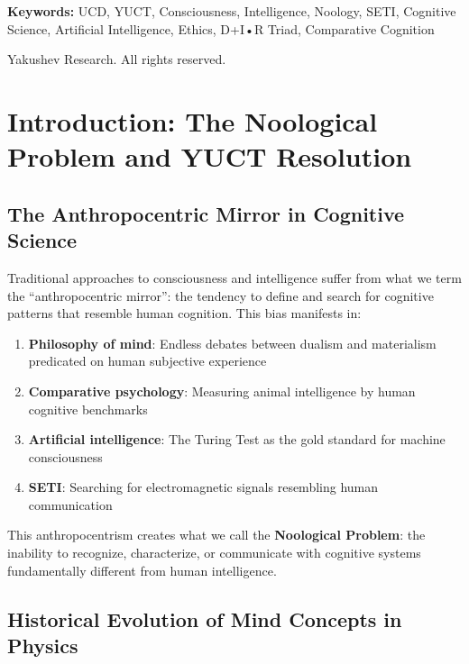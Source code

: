 \documentclass[12pt,a4paper]{article}
\begin{document}
\begin{titlepage}
\begin{center}
			\vspace{0cm}
			
			\noindent
			\small\textbf{Keywords:} UCD, YUCT, Consciousness, Intelligence, Noology, SETI, Cognitive Science, Artificial Intelligence, Ethics, D+I•R Triad, Comparative Cognition
			
			\vspace{0.5cm}
			
			\noindent
			 Yakushev Research. All rights reserved.
		\end{center}
	\end{titlepage}
	
	\tableofcontents
	
	\newpage
	
	\section{Introduction: The Noological Problem and YUCT Resolution}
	
	\subsection{The Anthropocentric Mirror in Cognitive Science}
	
	Traditional approaches to consciousness and intelligence suffer from what we term the ``anthropocentric mirror'': the tendency to define and search for cognitive patterns that resemble human cognition. This bias manifests in:
	\begin{enumerate}
		\item \textbf{Philosophy of mind}: Endless debates between dualism and materialism predicated on human subjective experience
		\item \textbf{Comparative psychology}: Measuring animal intelligence by human cognitive benchmarks
		\item \textbf{Artificial intelligence}: The Turing Test as the gold standard for machine consciousness
		\item \textbf{SETI}: Searching for electromagnetic signals resembling human communication
	\end{enumerate}
	This anthropocentrism creates what we call the \textbf{Noological Problem}: the inability to recognize, characterize, or communicate with cognitive systems fundamentally different from human intelligence.
	
	\subsection{Historical Evolution of Mind Concepts in Physics}
	
\end{document}
